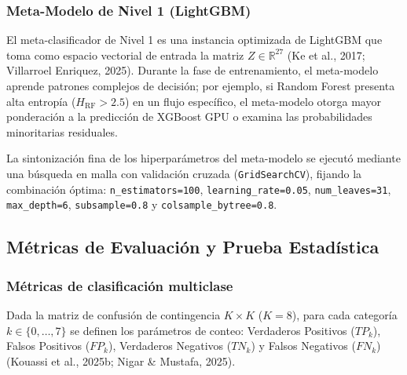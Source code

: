 \subsubsection{Meta-Modelo de Nivel 1 (LightGBM)}
El meta-clasificador de Nivel 1 es una instancia optimizada de LightGBM que toma como espacio vectorial de entrada la matriz $Z \in \mathbb{R}^{27}$ (Ke et al., 2017; Villarroel Enriquez, 2025). Durante la fase de entrenamiento, el meta-modelo aprende patrones complejos de decisión; por ejemplo, si Random Forest presenta alta entropía ($H_{\mathrm{RF}} > 2.5$) en un flujo específico, el meta-modelo otorga mayor ponderación a la predicción de XGBoost GPU o examina las probabilidades minoritarias residuales.

La sintonización fina de los hiperparámetros del meta-modelo se ejecutó mediante una búsqueda en malla con validación cruzada (\texttt{GridSearchCV}), fijando la combinación óptima: \texttt{n\_estimators=100}, \texttt{learning\_rate=0.05}, \texttt{num\_leaves=31}, \texttt{max\_depth=6}, \texttt{subsample=0.8} y \texttt{colsample\_bytree=0.8}.

\subsection{Métricas de Evaluación y Prueba Estadística}

\subsubsection{Métricas de clasificación multiclase}
Dada la matriz de confusión de contingencia $K \times K$ ($K=8$), para cada categoría $k \in \{0, \dots, 7\}$ se definen los parámetros de conteo: Verdaderos Positivos ($TP_k$), Falsos Positivos ($FP_k$), Verdaderos Negativos ($TN_k$) y Falsos Negativos ($FN_k$) (Kouassi et al., 2025b; Nigar \& Mustafa, 2025).


